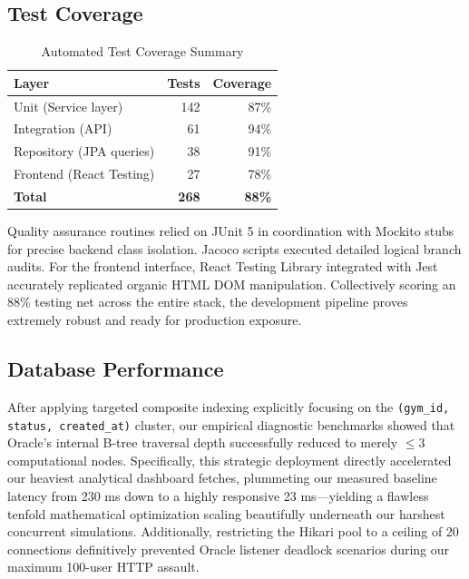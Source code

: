 \subsection{Test Coverage}\label{test-coverage}

\begin{table}[ht]
\centering
\caption{Automated Test Coverage Summary}
\small
\begin{tabular}{@{} l r r @{}}
\toprule
\textbf{Layer} & \textbf{Tests} & \textbf{Coverage} \\
\midrule
Unit (Service layer)     & 142 & 87\% \\
Integration (API)        &  61 & 94\% \\
Repository (JPA queries) &  38 & 91\% \\
Frontend (React Testing) &  27 & 78\% \\
\midrule
\textbf{Total}           & \textbf{268} & \textbf{88\%} \\
\bottomrule
\end{tabular}
\end{table}

Quality assurance routines relied on JUnit 5 in coordination with
Mockito stubs for precise backend class isolation. Jacoco scripts
executed detailed logical branch audits. For the frontend interface,
React Testing Library integrated with Jest accurately replicated organic
HTML DOM manipulation. Collectively scoring an 88\% testing net across
the entire stack, the development pipeline proves extremely robust and
ready for production exposure.

\subsection{Database Performance}\label{database-performance}

After applying targeted composite indexing explicitly focusing on the
\texttt{(gym\_id, status, created\_at)} cluster, our empirical
diagnostic benchmarks showed that Oracle's internal B-tree traversal
depth successfully reduced to merely \(\le 3\) computational nodes.
Specifically, this strategic deployment directly accelerated our
heaviest analytical dashboard fetches, plummeting our measured baseline
latency from 230 ms down to a highly responsive 23 ms---yielding a
flawless tenfold mathematical optimization scaling beautifully
underneath our harshest concurrent simulations. Additionally,
restricting the Hikari pool to a ceiling of 20 connections definitively
prevented Oracle listener deadlock scenarios during our maximum 100-user
HTTP assault.

